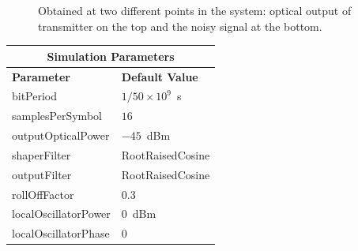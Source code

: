 \begin{refsection}
\begin{figure}[H]
\begin{minipage}{\linewidth}
	\caption{
		Obtained
		at two different points in the system: optical output of transmitter on the top and
		the noisy signal at the bottom.
		\label{fig:eyes_n_rc_45_03}}
	\end{minipage}
\end{figure}
\begin{table}[H]
	\centering
	\footnotesize
	\begin{tabular}{|l|l|}
		\hline
		\multicolumn{2}{|c|}{ \textbf{Simulation Parameters} } \\
		\hline
		\textbf{Parameter}     & \textbf{Default Value}                                     \\\hline
		bitPeriod              & $1/50\times10^9$~s														\\\hline
		samplesPerSymbol       & $16$                                                       \\\hline
		outputOpticalPower     & $-45$~dBm 													\\ \hline
		shaperFilter	       & RootRaisedCosine												\\ \hline
		outputFilter		   & RootRaisedCosine												\\ \hline
		rollOffFactor		   & 0.3														\\ \hline
		localOscillatorPower   & $0$~dBm                                                    \\ \hline
		localOscillatorPhase   & $0$                                                        \\ \hline

\end{tabular}
\end{table}
\end{refsection}
